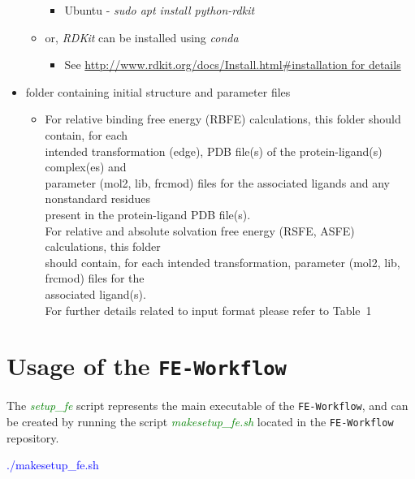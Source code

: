 \documentclass[11pt,letterpaper,titlepage]{article}
\newcommand{\wf}{\texttt{FE-Workflow}}
\begin{document}
\begin{itemize}
\begin{itemize}
\begin{itemize}
			\item{Ubuntu - \textit{sudo apt install python-rdkit}}
		\end{itemize}
		\item{or, \textit{RDKit} can be installed using \textit{conda}}
		\begin{itemize}
			\item{See \url{http://www.rdkit.org/docs/Install.html\#installation for details}}
		\end{itemize}
	\end{itemize}
	\item{folder containing initial structure and parameter files}
		\begin{itemize}
			\item For relative binding free energy (RBFE) calculations, this folder should contain, for each \\
				intended transformation (edge), PDB file(s) of the protein-ligand(s) complex(es) and  \\
				parameter (mol2, lib, frcmod) files for the associated ligands and any nonstandard residues  \\
				present in the protein-ligand PDB file(s).  \\
				For relative and absolute solvation free energy (RSFE, ASFE) calculations, this folder \\
				should contain, for each intended transformation, parameter (mol2, lib, frcmod) files for the  \\
				associated ligand(s). \\
				For further details related to input format please refer to Table~1 \\
		\end{itemize}
\end{itemize}

\vspace{0.1cm}
\section{Usage of the \wf{}}
\vspace{0.1cm}

The \textcolor{green}{\textit{setup\_fe}} script represents the main executable of the \wf{}, 
and can be created by running the script \textcolor{green}{\textit{makesetup\_fe.sh}} located 
in the \wf{} repository. 


\vspace{0.1cm}
\centerline{\textcolor{blue}{./makesetup\_fe.sh}}
\vspace{0.1cm}
\end{document}
